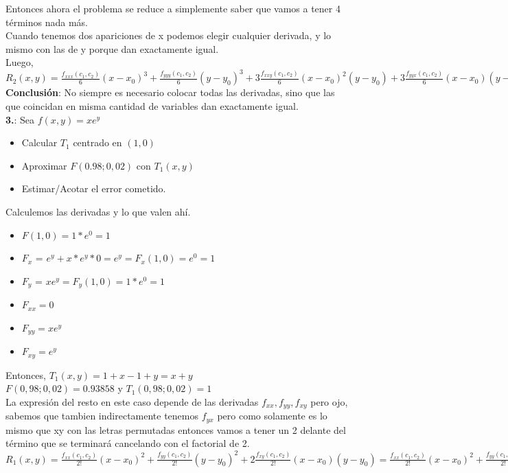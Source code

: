\documentclass[10pt,a4paper]{article}
\begin{document}
Entonces ahora el problema se reduce a simplemente saber que vamos a tener 4 términos nada más. \\
Cuando tenemos dos apariciones de x podemos elegir cualquier derivada, y lo mismo con las de y porque dan exactamente igual. \\
Luego, $R_{2}(x,y) = \frac{f_{xxx}(c_{1}, c_{2})}{6}(x-x_{0})^{3} + \frac{f_{yyy}(c_{1}, c_{2})}{6}(y-y_{0})^{3} + 3 \frac{f_{xxy}(c_{1}, c_{2})}{6}(x-x_{0})^{2}(y-y_{0}) + 3 \frac{f_{yyx}(c_{1}, c_{2})}{6}(x-x_{0})(y-y_{0})^{2} \equiv \frac{f_{xxx}(c_{1}, c_{2})}{6}(x-x_{0})^{3} + \frac{f_{yyy}(c_{1}, c_{2})}{6}(y-y_{0})^{3} + \frac{f_{xxy}(c_{1}, c_{2})}{2}(x-x_{0})^{2}(y-y_{0}) + \frac{f_{yyx}(c_{1}, c_{2})}{2}(x-x_{0})(y-y_{0})^{2} $ \\
\textbf{Conclusión}: No siempre es necesario colocar todas las derivadas, sino que las que coincidan en misma cantidad de variables dan exactamente igual. \\
\textbf{3.}: Sea $f(x,y) = xe^{y}$
\begin{itemize}
    \item Calcular $T_{1}$ centrado en $(1,0)$
    \item Aproximar $F(0.98; 0,02)$ con $T_{1} (x,y)$
    \item Estimar/Acotar el error cometido. 
\end{itemize}
Calculemos las derivadas y lo que valen ahí.
\begin{itemize}
    \item $F(1,0) = 1 * e^{0} = 1$
    \item $F_{x}$ = $e^{y} + x * e^{y} * 0 = e^{y} = F_{x}(1,0) = e^{0} = 1 $
    \item $F_{y}$ = $xe^{y} = F_{y}(1,0) = 1 * e^{0} = 1$
    \item $F_{xx} = 0$
    \item $F_{yy} = xe^{y}$
    \item $F_{xy} = e^{y}$
\end{itemize}
Entonces, $T_{1}(x,y) = 1 + x-1 + y = x + y$ \\
$F(0,98; 0,02) = 0.93858$ y $T_{1}(0,98; 0,02) = 1$ \\
La expresión del resto en este caso depende de las derivadas $f_{xx}, f_{yy}, f_{xy}$ pero ojo, sabemos que tambien indirectamente tenemos $f_{yx}$ pero como solamente es lo mismo que xy con las letras permutadas entonces vamos a tener un 2 delante del término que se terminará cancelando con el factorial de 2. \\
$R_{1}(x, y) = \frac{f_{xx}(c_{1}, c_{2})}{2!}(x-x_{0})^{2} + \frac{f_{yy}(c_{1}, c_{2})}{2!}(y-y_{0})^{2} + 2\frac{f_{xy}(c_{1}, c_{2})}{2!}(x-x_{0})(y-y_{0}) = \frac{f_{xx}(c_{1}, c_{2})}{2!}(x-x_{0})^{2} + \frac{f_{yy}(c_{1}, c_{2})}{2!}(y-y_{0})^{2} + f_{xy}(c_{1}, c_{2})(x-x_{0})(y-y_{0}) $ \\
\end{document}
